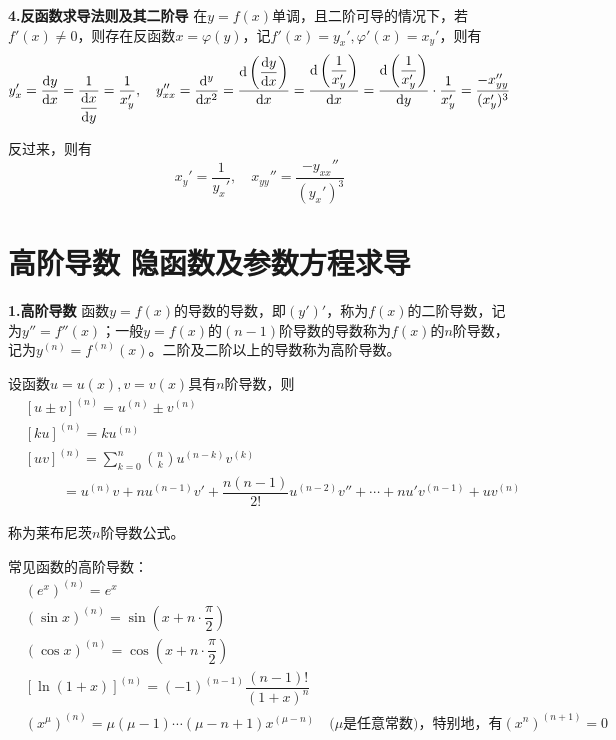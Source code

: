 \textbf{4.反函数求导法则及其二阶导} \quad 在$y=f(x)$单调，且二阶可导的情况下，若$f'(x)\neq0$，则存在反函数$x=\varphi(y)$，记$f'(x)=y_x',\varphi'(x)=x_y'$，则有
\begin{equation}
    y_x'=\dfrac{\mathrm{d} y}{\mathrm{d} x}=\dfrac{1}{\dfrac{\mathrm{d} x}{\mathrm{d} y}}=\dfrac{1}{x_y'}, \quad y_{xx}''=\dfrac{\mathrm{d}^y}{\mathrm{d} x^2}=\dfrac{\mathrm{d}\left(\dfrac{\mathrm{d} y}{\mathrm{d} x}\right)}{\mathrm{d} x}=\dfrac{\mathrm{d}\left( \dfrac{1}{x_y'} \right)}{\mathrm{d} x}=\dfrac{\mathrm{d}\left( \dfrac{1}{x_y'} \right)}{\mathrm{d} y}\cdot\dfrac{1}{x_y'}=\dfrac{-x_{yy}''}{(x_y')^3}
    \nonumber
\end{equation}

反过来，则有
\begin{equation}
    x_y'=\dfrac{1}{y_x'},\quad x_{yy}''=\dfrac{-y_{xx}''}{(y_x')^3}
    \nonumber
\end{equation}

\section{高阶导数 \quad 隐函数及参数方程求导}
\textbf{1.高阶导数} \quad 函数$y=f(x)$的导数的导数，即$(y')'$，称为$f(x)$的二阶导数，记为$y''=f''(x)$；一般$y=f(x)$的$(n-1)$阶导数的导数称为$f(x)$的$n$阶导数，记为$y^{(n)}=f^{(n)}(x)$。二阶及二阶以上的导数称为高阶导数。

设函数$u=u(x),v=v(x)$具有$n$阶导数，则
\begin{equation}
    \begin{aligned}
        & [u\pm v]^{(n)}=u^{(n)}\pm v^{(n)} \\
        & [ku]^{(n)}=ku^{(n)} \\
        & [uv]^{(n)}=\sum_{k=0}^n \binom{n}{k} u^{(n-k)} v^{(k)} \\
        & \qquad \ \ \ =u^{(n)}v+nu^{(n-1)}v'+\dfrac{n(n-1)}{2!}u^{(n-2)}v''+\cdots+nu'v^{(n-1)}+uv^{(n)}
    \end{aligned}
    \nonumber
\end{equation}

称为莱布尼茨$n$阶导数公式。

常见函数的高阶导数：
\begin{equation}
    \begin{aligned}
        &(e^x)^{(n)}=e^x \\
        &(\sin x)^{(n)} = \sin\left( x+n\cdot\dfrac{\pi}{2} \right) \\
        &(\cos x)^{(n)} = \cos\left( x+n\cdot\dfrac{\pi}{2} \right) \\
        &[\ln(1+x)]^{(n)}=(-1)^{(n-1)}\dfrac{(n-1)!}{(1+x)^n} \\
        &(x^\mu)^{(n)}=\mu(\mu-1)\cdots(\mu-n+1)x^{(\mu-n)} \quad (\mu\mbox{是任意常数)，特别地，有} (x^n)^{(n+1)}=0
    \end{aligned}
    \nonumber
\end{equation}

